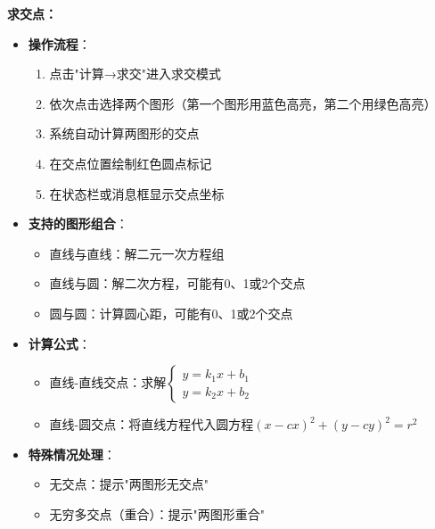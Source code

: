 \documentclass[12pt,a4paper]{article}
\begin{document}
\begin{tcolorbox}
\textbf{求交点：}
\begin{itemize}
    \item \textbf{操作流程}：
    \begin{enumerate}
        \item 点击"计算→求交"进入求交模式
        \item 依次点击选择两个图形（第一个图形用蓝色高亮，第二个用绿色高亮）
        \item 系统自动计算两图形的交点
        \item 在交点位置绘制红色圆点标记
        \item 在状态栏或消息框显示交点坐标
    \end{enumerate}
    \item \textbf{支持的图形组合}：
    \begin{itemize}
        \item 直线与直线：解二元一次方程组
        \item 直线与圆：解二次方程，可能有0、1或2个交点
        \item 圆与圆：计算圆心距，可能有0、1或2个交点
    \end{itemize}
    \item \textbf{计算公式}：
    \begin{itemize}
        \item 直线-直线交点：求解$\begin{cases} y = k_1x + b_1 \\ y = k_2x + b_2 \end{cases}$
        \item 直线-圆交点：将直线方程代入圆方程$(x-cx)^2 + (y-cy)^2 = r^2$
    \end{itemize}
    \item \textbf{特殊情况处理}：
    \begin{itemize}
        \item 无交点：提示"两图形无交点"
        \item 无穷多交点（重合）：提示"两图形重合"
    \end{itemize}
\end{itemize}


\end{tcolorbox}
\end{document}
